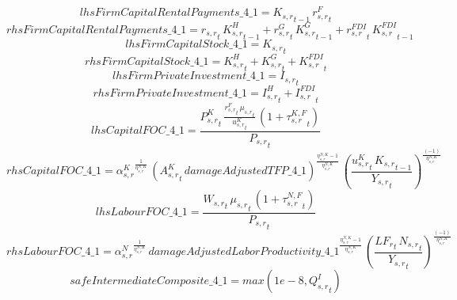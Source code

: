 \begin{dmath*}
lhsFirmCapitalRentalPayments\_4\_1 = {{K_{s,r}}}_{t-1}\, {{r^F_{s,r}}}_{t}
\end{dmath*}
\begin{dmath*}
rhsFirmCapitalRentalPayments\_4\_1 = {{r_{s,r}}}_{t}\, {{K^H_{s,r}}}_{t-1}+{{r^G_{s,r}}}_{t}\, {{K^G_{s,r}}}_{t-1}+{{r^{FDI}_{s,r}}}_{t}\, {{K^{FDI}_{s,r}}}_{t-1}
\end{dmath*}
\begin{dmath*}
lhsFirmCapitalStock\_4\_1 = {{K_{s,r}}}_{t}
\end{dmath*}
\begin{dmath*}
rhsFirmCapitalStock\_4\_1 = {{K^H_{s,r}}}_{t}+{{K^G_{s,r}}}_{t}+{{K^{FDI}_{s,r}}}_{t}
\end{dmath*}
\begin{dmath*}
lhsFirmPrivateInvestment\_4\_1 = {{I_{s,r}}}_{t}
\end{dmath*}
\begin{dmath*}
rhsFirmPrivateInvestment\_4\_1 = {{I^H_{s,r}}}_{t}+{{I^{FDI}_{s,r}}}_{t}
\end{dmath*}
\begin{dmath*}
lhsCapitalFOC\_4\_1 = \frac{{{P^K_{s,r}}}_{t}\, \frac{{{r^F_{s,r}}}_{t}\, {{\mu_{s,r}}}_{t}}{{{u^K_{s,r}}}_{t}}\, \left(1+{{\tau^{K,F}_{s,r}}}_{t}\right)}{{{P_{s,r}}}_{t}}
\end{dmath*}
\begin{dmath*}
rhsCapitalFOC\_4\_1 = {{\alpha^{K}_{s,r}}}^{\frac{1}{{{\eta^{N,K}_{s,r}}}}}\, \left({{A^{K}_{s,r}}}_{t}\, {damageAdjustedTFP\_4\_1}\right)^{\frac{{{\eta^{N,K}_{s,r}}}-1}{{{\eta^{N,K}_{s,r}}}}}\, \left(\frac{{{u^K_{s,r}}}_{t}\, {{K_{s,r}}}_{t-1}}{{{Y_{s,r}}}_{t}}\right)^{\frac{\left(-1\right)}{{{\eta^{N,K}_{s,r}}}}}
\end{dmath*}
\begin{dmath*}
lhsLabourFOC\_4\_1 = \frac{{{W_{s,r}}}_{t}\, {{\mu_{s,r}}}_{t}\, \left(1+{{\tau^{N,F}_{s,r}}}_{t}\right)}{{{P_{s,r}}}_{t}}
\end{dmath*}
\begin{dmath*}
rhsLabourFOC\_4\_1 = {{\alpha^{N}_{s,r}}}^{\frac{1}{{{\eta^{N,K}_{s,r}}}}}\, {damageAdjustedLaborProductivity\_4\_1}^{\frac{{{\eta^{N,K}_{s,r}}}-1}{{{\eta^{N,K}_{s,r}}}}}\, \left(\frac{{{LF_r}}_{t}\, {{N_{s,r}}}_{t}}{{{Y_{s,r}}}_{t}}\right)^{\frac{\left(-1\right)}{{{\eta^{N,K}_{s,r}}}}}
\end{dmath*}
\begin{dmath*}
safeIntermediateComposite\_4\_1 = max(1e-8,{{Q^{I}_{s,r}}}_{t})
\end{dmath*}
